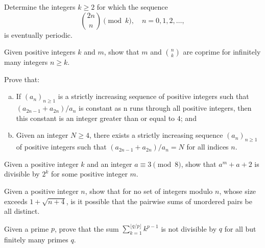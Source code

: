 \documentclass[problems.tex]{subfile}
\begin{document}
	
	\begin{problem}
		Determine the integers $k \geq 2$ for which the sequence$$\binom{2n}{n} \pmod k ,\quad n = 0, 1, 2, \dots,$$ is eventually periodic.
	\end{problem}
	
	
	
	\begin{problem}
		Given positive integers $k$ and $m$, show that $m$ and
		$\binom{n}{k}$ are coprime for infinitely many integers $n \geq k$.
	\end{problem}
	
	
	\begin{problem}
		Prove that:
		\begin{enumerate}[(a)]
			\item If $(a_n)_{n\geq 1}$ is a strictly increasing sequence of positive integers such that $(a_{2n-1}+a_{2n})/a_n$ is constant as n runs through all positive integers, then this constant is an integer greater than or equal to $4$; and
			\item Given an integer $N \geq 4$, there exists a strictly increasing sequence $(a_n)_{n\geq 1}$ of positive integers such that $(a_{2n-1}+a_{2n})/a_n=N$ for all indices $n$.
		\end{enumerate}
	\end{problem}
	
	
	\begin{problem}
		Given a positive integer $k$ and an integer $a \equiv 3 \pmod 8$, show that $a^m + a + 2$ is divisible by $2^k$ for some positive integer $m$.
	\end{problem}
	
	
	\begin{problem}
		Given a positive integer $n$, show that for no set of integers modulo $n$, whose size exceeds $1 + \sqrt{n + 4}$, is it possible that the pairwise sums of unordered pairs be all distinct.
	\end{problem}
	
	
	
	\begin{problem}
		Given a prime $p$, prove that the sum $\sum\limits_{k=1}^{\lfloor q/p \rfloor}{k^{p-1}}$ is not divisible by $q$ for all but finitely many primes $q$. %
	\end{problem}
	
	
	
\end{document}
